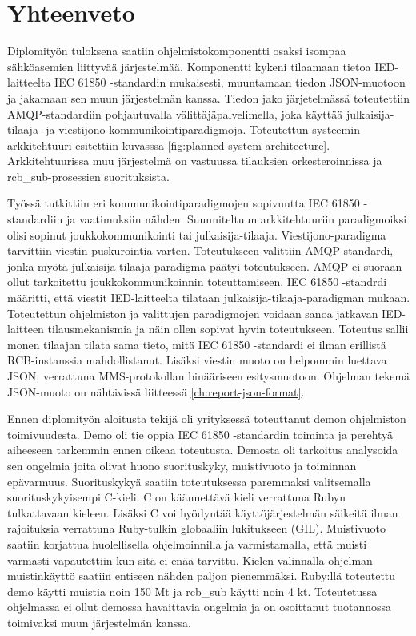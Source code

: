 \chapter{Yhteenveto}
\label{ch:yhteenveto}
Diplomityön tuloksena saatiin ohjelmistokomponentti osaksi isompaa sähköasemien liittyvää järjestelmää. Komponentti kykeni tilaamaan tietoa IED-laitteelta IEC 61850 -stan\-dar\-din mukaisesti, muuntamaan tiedon JSON-muotoon ja jakamaan sen muun järjestelmän kanssa. Tiedon jako järjetelmässä toteutettiin AMQP-standardiin pohjautuvalla välittäjäpalvelimella, joka käyttää julkaisija-tilaaja- ja viestijono-kommunikointiparadigmoja. Toteutettun systeemin arkkitehtuuri esitettiin kuvasssa \ref{fig:planned-system-architecture}. Arkkitehtuurissa muu järjestelmä on vastuussa tilauksien orkesteroinnissa ja rcb\_sub-prosessien suorituksista.

Työssä tutkittiin eri kommunikointiparadigmojen sopivuutta IEC 61850 -standardiin ja vaatimuksiin nähden. Suunniteltuun arkkitehtuuriin paradigmoiksi olisi sopinut joukkokommunikointi tai julkaisija-tilaaja. Viestijono-paradigma tarvittiin viestin puskurointia varten. Toteutukseen valittiin AMQP-standardi, jonka myötä julkaisija-tilaaja-paradigma päätyi toteutukseen. AMQP ei suoraan ollut tarkoitettu joukkokommunikoinnin toteuttamiseen. IEC 61850 -standrdi määritti, että viestit IED-laitteelta tilataan julkaisija-tilaaja-paradigman mukaan. Toteutettun ohjelmiston ja valittujen paradigmojen voidaan sanoa jatkavan IED-laitteen tilausmekanismia ja näin ollen sopivat hyvin toteutukseen. Toteutus sallii monen tilaajan tilata sama tieto, mitä IEC 61850 -standardi ei ilman erillistä RCB-instanssia mahdollistanut. Lisäksi viestin muoto on helpommin luettava JSON, verrattuna MMS-protokollan binääriseen esitysmuotoon. Ohjelman tekemä JSON-muoto on nähtävissä liitteessä \ref{ch:report-json-format}.

Ennen diplomityön aloitusta tekijä oli yrityksessä toteuttanut demon ohjelmiston toimivuudesta. Demo oli tie oppia IEC 61850 -standardin toiminta ja perehtyä aiheeseen tarkemmin ennen oikeaa toteutusta. Demosta oli tarkoitus analysoida sen ongelmia joita olivat huono suorituskyky, muistivuoto ja toiminnan epävarmuus. Suorituskykyä saatiin toteutuksessa paremmaksi valitsemalla suorituskykyisempi C-kieli. C on käännettävä kieli verrattuna Rubyn tulkattavaan kieleen. Lisäksi C voi hyödyntää käyttöjärjestelmän säikeitä ilman rajoituksia verrattuna Ruby-tulkin globaaliin lukitukseen (GIL). Muistivuoto saatiin korjattua huolellisella ohjelmoinnilla ja varmistamalla, että muisti varmasti vapautettiin kun sitä ei enää tarvittu. Kielen valinnalla ohjelman muistinkäyttö saatiin entiseen nähden paljon pienemmäksi. Ruby:llä toteutettu demo käytti muistia noin 150 Mt ja rcb\_sub käytti noin 4 kt. Toteutetussa ohjelmassa ei ollut demossa havaittavia ongelmia ja on osoittanut tuotannossa toimivaksi muun järjestelmän kanssa.

